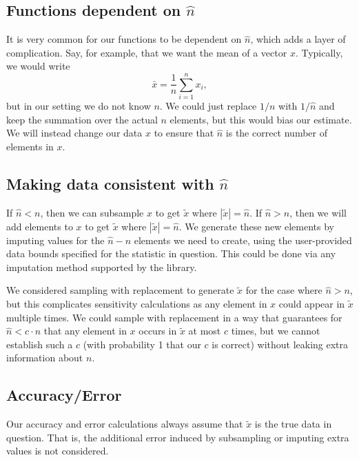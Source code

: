\documentclass[11pt]{scrartcl} %
\begin{document}
\subsection{Functions dependent on $\hat{n}$}
It is very common for our functions to be dependent on $\hat{n}$, which adds a layer of complication.
Say, for example, that we want the mean of a vector $x$. Typically, we would write
\[ \bar{x} = \frac{1}{n} \sum_{i=1}^{n} x_i, \]
but in our setting we do not know $n$. We could just replace $1/n$ with $1/\hat{n}$ and keep
the summation over the actual $n$ elements, but this would bias our estimate.
We will instead change our data $x$ to ensure that $\hat{n}$ is the correct number of elements in $x$.

\subsection{Making data consistent with $\hat{n}$}
If $\hat{n} < n$, then we can subsample $x$ to get $\tilde{x}$ where $|\tilde{x}| = \hat{n}$. \newline
If $\hat{n} > n$, then we will add elements to $x$ to get $\tilde{x}$ where $|\tilde{x}| = \hat{n}$. \newline
We generate these new elements by imputing values for the $\hat{n} - n$ elements we need to create, using
the user-provided data bounds specified for the statistic in question.
This could be done via any imputation method supported by the library. \newline

We considered sampling with replacement to generate $\tilde{x}$ for the case where $\hat{n} > n$,
but this complicates sensitivity calculations as any element in $x$ could appear in $\tilde{x}$ multiple times.
We could sample with replacement in a way that guarantees for $\hat{n} < c \cdot n$ that any element in
$x$ occurs in $\tilde{x}$ at most $c$ times, but we cannot establish such a $c$ (with probability 1 that our
$c$ is correct) without leaking extra information about $n$. \newline

\subsection{Accuracy/Error}
Our accuracy and error calculations always assume that $\tilde{x}$ is the true data in question.
That is, the additional error induced by subsampling or imputing extra values is not considered.



\end{document}
